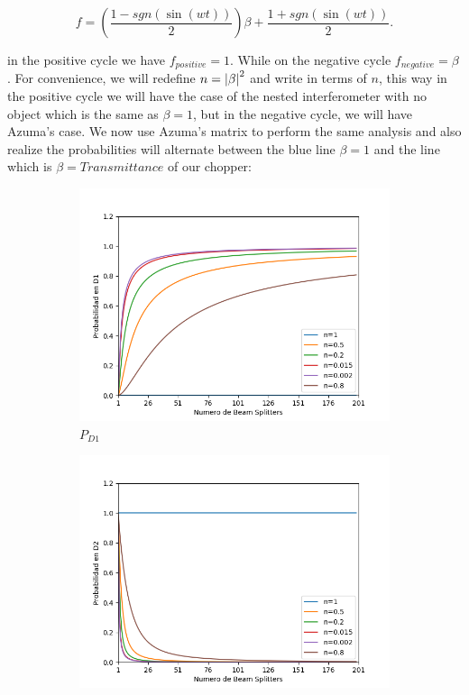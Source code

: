 \documentclass[12pt]{article}
\begin{document}
\begin{equation}
f=\left(\frac{1-sgn(\sin(wt))}{2} \right)\beta+\frac{1+sgn(\sin(wt))}{2}.
\end{equation}

in the positive cycle we have $f_{positive}=1$. While on the negative cycle $f_{negative}=\beta$. For convenience, we will redefine $n=\abs{\beta}^{2}$ and write in terms of $n$, this way in the positive cycle we will have the case of the nested interferometer with no object which is the same as  $\beta=1$, but in the negative cycle, we will have  Azuma's case. We now use Azuma's matrix to perform the same analysis and also realize the probabilities will alternate between the blue line $\beta=1$ and the line which is $\beta=Transmittance$ of our chopper:


 \begin{figure}[!htb]
\centering
\begin{subfigure}[b]{0.45\linewidth}
\includegraphics[width=\linewidth]{images/ChopperD1.png}
\caption{$P_{D1}$}
\label{fig:BS1}
\end{subfigure}
\begin{subfigure}[b]{0.45\linewidth}
\includegraphics[width=\linewidth]{images/ChopperD2.png}

\end{subfigure}
\end{figure}
\end{document}
